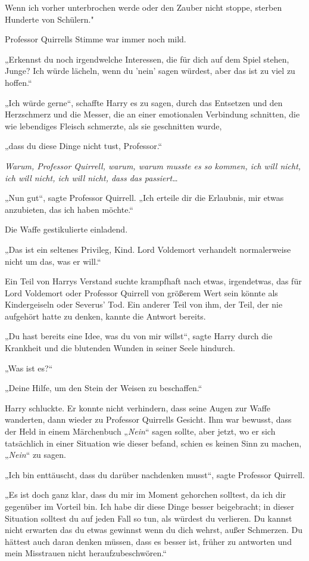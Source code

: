{Wenn ich vorher unterbrochen werde oder den Zauber nicht stoppe, sterben Hunderte von Schülern."

Professor Quirrells Stimme war immer noch mild.

„Erkennst du noch irgendwelche Interessen, die für dich auf dem Spiel stehen, Junge? Ich würde lächeln, wenn du 'nein' sagen würdest, aber das ist zu viel zu hoffen.“

„Ich würde gerne“, schaffte Harry es zu sagen, durch das Entsetzen und den Herzschmerz und die Messer, die an einer emotionalen Verbindung schnitten, die wie lebendiges Fleisch schmerzte, als sie geschnitten wurde,

„dass du diese Dinge nicht tust, Professor.“

\emph{Warum, Professor Quirrell, warum, warum musste es so kommen, ich will nicht, ich will nicht, ich will nicht, dass das passiert…}

„Nun gut“, sagte Professor Quirrell. „Ich erteile dir die Erlaubnis, mir etwas anzubieten, das ich haben möchte.“

Die Waffe gestikulierte einladend.

„Das ist ein seltenes Privileg, Kind. Lord Voldemort verhandelt normalerweise nicht um das, was er will.“

Ein Teil von Harrys Verstand suchte krampfhaft nach etwas, irgendetwas, das für Lord Voldemort oder Professor Quirrell von größerem Wert sein könnte als Kindergeiseln oder Severus' Tod. Ein anderer Teil von ihm, der Teil, der nie aufgehört hatte zu denken, kannte die Antwort bereits.

„Du hast bereits eine Idee, was du von mir willst“, sagte Harry durch die Krankheit und die blutenden Wunden in seiner Seele hindurch.

„Was ist es?“

„Deine Hilfe, um den Stein der Weisen zu beschaffen.“

Harry schluckte. Er konnte nicht verhindern, dass seine Augen zur Waffe wanderten, dann wieder zu Professor Quirrells Gesicht. Ihm war bewusst, dass der Held in einem Märchenbuch „\emph{Nein}“ sagen sollte, aber jetzt, wo er sich tatsächlich in einer Situation wie dieser befand, schien es keinen Sinn zu machen, „\emph{Nein}“ zu sagen.

„Ich bin enttäuscht, dass du darüber nachdenken musst“, sagte Professor Quirrell.

„Es ist doch ganz klar, dass du mir im Moment gehorchen solltest, da ich dir gegenüber im Vorteil bin. Ich habe dir diese Dinge besser beigebracht; in dieser Situation solltest du auf jeden Fall so tun, als würdest du verlieren. Du kannst nicht erwarten das du etwas gewinnst wenn du dich wehrst, außer Schmerzen. Du hättest auch daran denken müssen, dass es besser ist, früher zu antworten und mein Misstrauen nicht heraufzubeschwören.“

}
